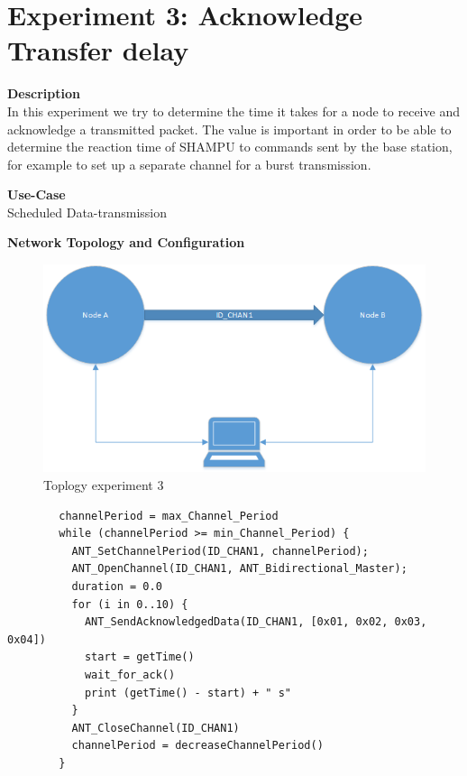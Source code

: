 \section{Experiment 3: Acknowledge Transfer delay}
\begin{description} 
	\item{\textbf{Description}} \hfill \\ In this experiment we try to determine the time it takes for a node to receive and acknowledge a transmitted packet. The value is important in order to be able to determine the reaction time of SHAMPU to commands sent by the base station, for example to set up a separate channel for a burst transmission.
	\item{\textbf{Use-Case}} \hfill \\ Scheduled Data-transmission
	\item{\textbf{Network Topology and Configuration}} \hfill \\ 
	\begin{figure}[H]
		\centering
		\includegraphics[scale=0.6]{./pics/exp1_topo.png}
		\caption{Toplogy experiment 3}
	\end{figure}
	\begin{code}[H]
		\begin{verbatim}
		channelPeriod = max_Channel_Period
		while (channelPeriod >= min_Channel_Period) {
		  ANT_SetChannelPeriod(ID_CHAN1, channelPeriod);
		  ANT_OpenChannel(ID_CHAN1, ANT_Bidirectional_Master);
		  duration = 0.0
		  for (i in 0..10) {
		    ANT_SendAcknowledgedData(ID_CHAN1, [0x01, 0x02, 0x03, 0x04])
		    start = getTime()	   
		    wait_for_ack()		
		    print (getTime() - start) + " s"	  
		  }
		  ANT_CloseChannel(ID_CHAN1)		
		  channelPeriod = decreaseChannelPeriod()
		} 
		\end{verbatim}
		\caption{Acknowledge data delay (Master)}\label{lst:mExp3}
	\end{code}
	

\end{description}
